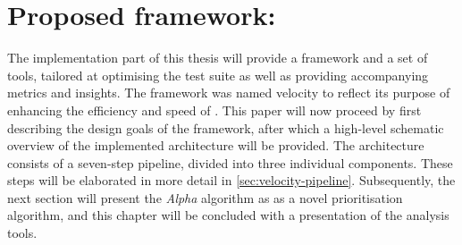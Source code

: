 
\chapter{Proposed framework: \velocity{}}
\label{ch:velocity}
The implementation part of this thesis will provide a framework and a set of tools, tailored at optimising the test suite as well as providing accompanying metrics and insights. The framework was named \Gls{velocity} to reflect its purpose of enhancing the efficiency and speed of \CI{}. This paper will now proceed by first describing the design goals of the framework, after which a high-level schematic overview of the implemented architecture will be provided. The architecture consists of a seven-step pipeline, divided into three individual components. These steps will be elaborated in more detail in \cref{sec:velocity-pipeline}. Subsequently, the next section will present the \emph{Alpha} algorithm as as a novel prioritisation algorithm, and this chapter will be concluded with a presentation of the analysis tools.


\clearpage

\clearpage

\clearpage

